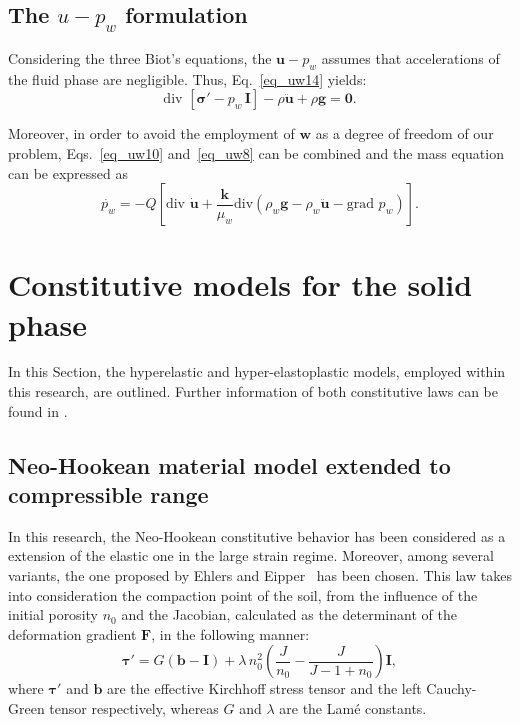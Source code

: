\documentclass[twocolumn]{svjour3}          %
\begin{document}
\subsection{The $u-p_w$ formulation}
\label{subsec:23}
Considering the three Biot's equations, the $\boldsymbol{u}-p_w$ assumes that accelerations of the fluid phase are negligible. Thus, Eq.~\eqref{eq_uw14} yields:
\begin{equation}\label{eq_uw15}
\mbox{div }\left[ \boldsymbol{ \sigma'} - p_{w} \, \textbf{I} \right]-\rho\boldsymbol{\ddot{u}}+\rho\boldsymbol{g}=\boldsymbol{0}.
\end{equation}

Moreover, in order to avoid the employment of $\boldsymbol{w}$ as a degree of freedom of our problem, Eqs.~\eqref{eq_uw10} and~\eqref{eq_uw8} can be combined and the mass equation can be expressed as
\begin{equation}\label{eq_uw11}
\dot{p_w} = -Q\left [ \mbox{div } \dot{\boldsymbol{u}} + \frac{\boldsymbol{k}}{\mu_w} \mbox{div}\left(   \rho_w \boldsymbol{g} - \rho_w \ddot{\boldsymbol{u}} - \mbox{grad }p_w\right)\right ].
\end{equation}


\section{Constitutive models for the solid phase} \label{sec:3}
In this Section, the hyperelastic and hyper-elastoplastic models, employed within this research, are outlined. Further information of both constitutive laws can be found in \cite{Navas2018,Navas:17b,Navas:17c}.
\subsection{Neo-Hookean material model extended to compressible range} \label{subsec:31}

In this research, the Neo-Hookean constitutive behavior has been considered as a extension of the elastic one in the large strain regime. Moreover, among several variants, the one proposed by Ehlers and Eipper~\cite{Ehlers:99} has been chosen. This law takes into consideration the compaction point of the soil, from the influence of  the initial porosity  $n_0$ and the Jacobian, calculated as the determinant of the deformation gradient $\boldsymbol{F}$, in the following manner:
\begin{equation}\label{eq_nh2}
\boldsymbol{\tau}'=G(\boldsymbol{b}-\textbf{I})+\lambda \, n_0^2\left(  \frac{J}{n_0}-\frac{J}{J-1+n_0} \right)\textbf{I},
\end{equation}
where $\boldsymbol{\tau}'$ and  $\boldsymbol{b}$ are the effective Kirchhoff stress tensor and the left Cauchy-Green tensor respectively, whereas $G$ and $\lambda$ are the Lam\'e constants.  
\end{document}
